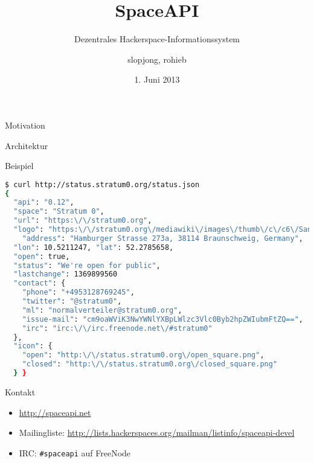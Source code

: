 \documentclass{beamer}
\author{slopjong, rohieb}
\title{SpaceAPI}
\subtitle{Dezentrales Hackerspace-Informationssystem}
\institute{GPN13}
\date{1. Juni 2013}
\begin{document}
\begin{frame}
	\maketitle
\end{frame}

\begin{frame}{Motivation}
\end{frame}

\begin{frame}{Architektur}
\end{frame}

\begin{frame}[fragile]{Beispiel}
\begin{lstlisting}[language=sh, basicstyle=\ttfamily\small]
$ curl http://status.stratum0.org/status.json
{
  "api": "0.12",
  "space": "Stratum 0",
  "url": "https:\/\/stratum0.org",
  "logo": "https:\/\/stratum0.org\/mediawiki\/images\/thumb\/c\/c6\/Sanduhr-twitter-avatar-black.svg\/240px-Sanduhr-twitter-avatar-black.svg.png",
	"address": "Hamburger Strasse 273a, 38114 Braunschweig, Germany",
  "lon": 10.5211247, "lat": 52.2785658,
  "open": true,
  "status": "We're open for public",
  "lastchange": 1369899560
  "contact": {
    "phone": "+4953128769245",
    "twitter": "@stratum0",
    "ml": "normalverteiler@stratum0.org",
    "issue-mail": "cm9oaWViK3NwYWNlYXBpLWlzc3Vlc0Byb2hpZWIubmFtZQ==",
    "irc": "irc:\/\/irc.freenode.net\/#stratum0"
  },
  "icon": {
    "open": "http:\/\/status.stratum0.org\/open_square.png",
    "closed": "http:\/\/status.stratum0.org\/closed_square.png"
  } }
\end{lstlisting}
\end{frame}

\begin{frame}[fragile]{Kontakt}
\begin{itemize}
	\item \url{http://spaceapi.net}
	\item Mailingliste:
		\url{http://lists.hackerspaces.org/mailman/listinfo/spaceapi-devel}
	\item IRC: \texttt{\#spaceapi} auf FreeNode
\end{itemize}
\end{frame}
\end{document}
